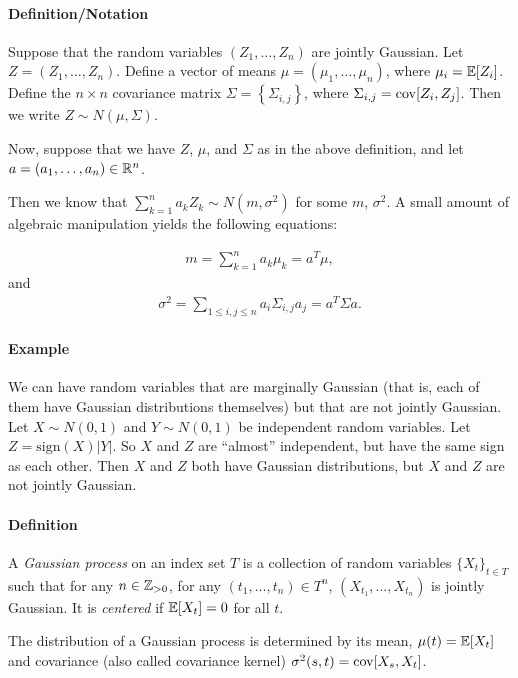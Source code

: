 \documentclass[../../../Master/AppliedStochastics.tex]{subfiles}
\begin{document}
\paragraph{Definition/Notation} Suppose that the random variables $(Z_1,\dots,Z_n)$ are jointly Gaussian.  
Let $Z=(Z_1,\dots,Z_n)$.  
Define a vector of means $\mu=(\mu_1, \ldots, \mu_n)$,
where $\mu_i = \mathbb{E}[Z_i]$.
Define the $n\times n$ covariance matrix 
$\Sigma=\left\{\Sigma_{i,j}\right\}$, where $\Sigma_{i,j}=\operatorname{cov}[Z_i,Z_j]$.  
Then we write $Z\sim N(\mu, \Sigma)$.

Now, suppose that we have $Z$, $\mu$, and $\Sigma$ as in the above definition, and let $a = (a_1,\dots,a_n) \in \mathbb{R}^n$.  

Then we know that $\sum_{k=1}^n a_kZ_k\sim N(m,\sigma^2)$ for some $m$, $\sigma^2$.  
A small amount of algebraic manipulation yields the following equations:

$$\begin{aligned}
    m=\sum_{k=1}^n a_k\mu_k=a^T\mu,
\end{aligned}$$
and 
$$\begin{aligned}
    \sigma^2=\sum_{1\leq i,j\leq n} a_i\Sigma_{i,j}a_j=a^T\Sigma a.
\end{aligned}$$


\paragraph{Example} 
We can have random variables that are marginally Gaussian (that is, each of them have Gaussian distributions themselves) but that are not jointly Gaussian.  
Let $X\sim N(0,1)$ and $Y\sim N(0,1)$ be independent random variables.  
Let $Z=\mathrm{sign}(X)|Y|$.  
So $X$ and $Z$ are ``almost'' independent, but have the same sign as each other.  
Then $X$ and $Z$ both have Gaussian distributions, but $X$ and $Z$ are not jointly Gaussian.

\paragraph{Definition} 
A \emph{Gaussian process} on an index set $T$ is a collection of random variables $\{X_t\}_{t\in T}$ 
such that for any $n\in\mathbb{Z}_{>0}$, for any $(t_1,\dots,t_n)\in T^n$, $(X_{t_1},\dots,X_{t_n})$ is jointly Gaussian.  
It is \emph{centered} if $\mathbb{E}[X_t]=0$ for all $t$.

The distribution of a Gaussian process is determined 
by its mean, $\mu(t)=\mathbb{E}[X_t]$ and covariance (also called covariance kernel) $\sigma^2(s,t)=\operatorname{cov}[X_s,X_t]$.
\end{document}
